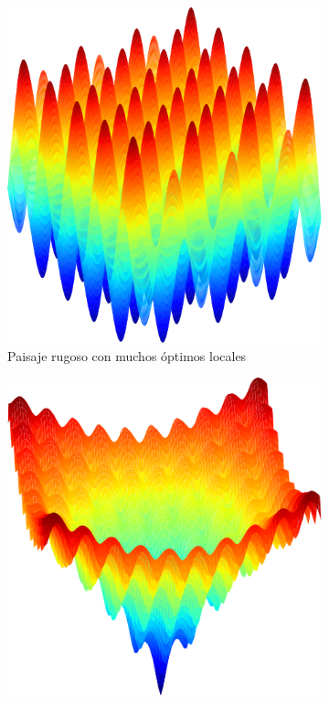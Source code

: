 \begin{figure}[]
\begin{subfigure}{.45\textwidth}
    \includegraphics[scale=.4]{Imagenes/rugged.png}
    \caption{Paisaje rugoso con muchos óptimos locales}
\end{subfigure}
\begin{subfigure}{.5\textwidth}
    \includegraphics[scale=.4]{Imagenes/ruggedvalley.png}

\end{subfigure}
\end{figure}
